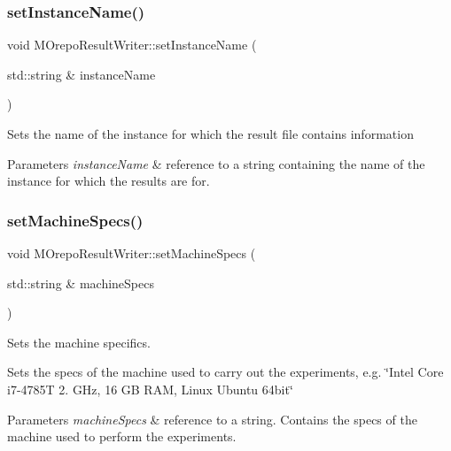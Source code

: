 \subsubsection{\texorpdfstring{set\+Instance\+Name()}{setInstanceName()}}
{\footnotesize\ttfamily void M\+Orepo\+Result\+Writer\+::set\+Instance\+Name (\begin{DoxyParamCaption}\item[{std\+::string \&}]{instance\+Name }\end{DoxyParamCaption})\hspace{0.3cm}{\ttfamily [inline]}}

Sets the name of the instance for which the result file contains information 
\begin{DoxyParams}{Parameters}
{\em instance\+Name} & reference to a string containing the name of the instance for which the results are for. \\
\hline
\end{DoxyParams}
\mbox{\label{class_m_orepo_result_writer_a8fbabd8b91249fa93119c45075d7b478}} 
\subsubsection{\texorpdfstring{set\+Machine\+Specs()}{setMachineSpecs()}}
{\footnotesize\ttfamily void M\+Orepo\+Result\+Writer\+::set\+Machine\+Specs (\begin{DoxyParamCaption}\item[{std\+::string \&}]{machine\+Specs }\end{DoxyParamCaption})\hspace{0.3cm}{\ttfamily [inline]}}



Sets the machine specifics. 

Sets the specs of the machine used to carry out the experiments, e.\+g. \char`\"{}\+Intel Core i7-\/4785\+T 2. G\+Hz, 16 G\+B R\+A\+M, Linux Ubuntu 64bit\char`\"{} 
\begin{DoxyParams}{Parameters}
{\em machine\+Specs} & reference to a string. Contains the specs of the machine used to perform the experiments. \\
\hline
\end{DoxyParams}
\mbox{\label{class_m_orepo_result_writer_a4b96d6797c67055383c8692c9d907dd9}} 
